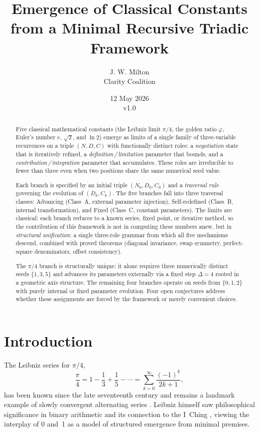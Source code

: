 \documentclass[12pt]{article}
\title{Emergence of Classical Constants from a Minimal Recursive Triadic Framework}
\author{J. W. Milton\\[4pt]\small Clarity Coalition}
\date{12 May 2026 \\ \small v1.0}
\theoremstyle{definition}
\theoremstyle{remark}
\begin{document}
\maketitle

\begin{abstract}
Five classical mathematical constants (the Leibniz limit $\pi/4$, the golden ratio
$\varphi$, Euler's number $e$, $\sqrt{2}$, and $\ln 2$) emerge as limits of a single
family of three-variable recurrences on a triple $(N, D, C)$ with functionally distinct
roles: a \emph{negotiation} state that is iteratively refined, a
\emph{definition\,/\,limitation} parameter that bounds, and a
\emph{contribution\,/\,integration} parameter that accumulates. These roles are
irreducible to fewer than three even when two positions share the same numerical seed value.

Each branch is specified by an initial triple $(N_0, D_0, C_0)$ and a \emph{traversal rule}
governing the evolution of $(D_k, C_k)$. The five branches fall into three traversal classes:
Advancing (Class~A, external parameter injection), Self-redefined (Class~B, internal
transformation), and Fixed (Class~C, constant parameters). The limits are classical: each
branch reduces to a known series, fixed point, or iterative method, so the contribution of
this framework is not in computing these numbers anew, but in \emph{structural unification}:
a single three-role grammar from which all five mechanisms descend, combined with proved
theorems (diagonal invariance, swap symmetry, perfect-square denominators, offset consistency).

The $\pi/4$ branch is structurally unique: it alone requires three numerically distinct seeds
$\{1, 3, 5\}$ and advances its parameters externally via a fixed step $\Delta = 4$ rooted in
a geometric axis structure. The remaining four branches operate on seeds from $\{0, 1, 2\}$
with purely internal or fixed parameter evolution. Four open conjectures address whether these
assignments are forced by the framework or merely convenient choices.
\end{abstract}

\tableofcontents
\section{Introduction}\label{sec:intro}

The Leibniz series for $\pi/4$,
\[
  \frac{\pi}{4} = 1 - \frac{1}{3} + \frac{1}{5} - \cdots
  = \sum_{k=0}^{\infty} \frac{(-1)^k}{2k+1},
\]
has been known since the late seventeenth century and remains a landmark example of
slowly convergent alternating series \cite{Lei82,Roy11}. Leibniz himself saw
philosophical significance in binary arithmetic and its connection to the I~Ching
\cite{Lei03}, viewing the interplay of 0 and~1 as a model of structured emergence from
minimal premises.
\end{document}
